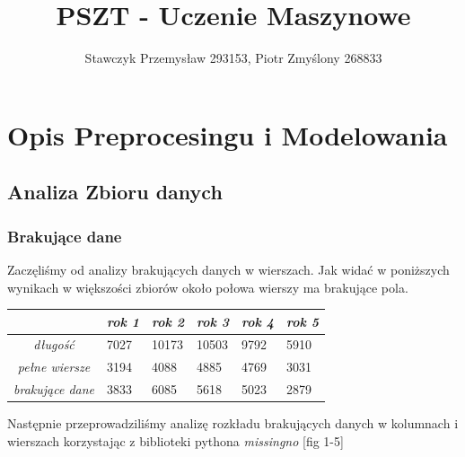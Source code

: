\documentclass[11pt]{article}
\title{PSZT - Uczenie Maszynowe}
\author{Stawczyk Przemysław 293153, Piotr Zmyślony 268833}
\date{} %
\begin{document}
	\maketitle
	\setcounter{secnumdepth}{3}
	\setcounter{tocdepth}{3}
	\tableofcontents
	\clearpage

\section{Opis Preprocesingu i Modelowania}
\subsection{Analiza Zbioru danych}
\subsubsection{Brakujące dane}
Zaczęliśmy od analizy brakujących danych w wierszach. Jak widać w poniższych wynikach w większości zbiorów około połowa wierszy ma brakujące pola.
\begin{center}
\begin{tabular}{|c|m{0.7in}|m{0.7in}|m{0.7in}|m{0.7in}|m{0.7in}|}
	\hline
	& \textit{rok 1} & \textit{rok 2} & \textit{rok 3} & \textit{rok 4} & \textit{rok 5} \\ \hline
	\textit{długość} & 7027 & 10173 & 10503 & 9792 & 5910 \\ \hline
	\textit{pełne wiersze} & 3194 & 4088 & 4885 & 4769 & 3031 \\ \hline
	\textit{brakujące dane} & 3833 & 6085 & 5618 & 5023 & 2879 \\ \hline
\end{tabular}
\end{center}
Następnie przeprowadziliśmy analizę rozkładu brakujących danych w kolumnach i wierszach korzystając z biblioteki pythona \textit{missingno} [fig 1-5]\\
\end{document}
